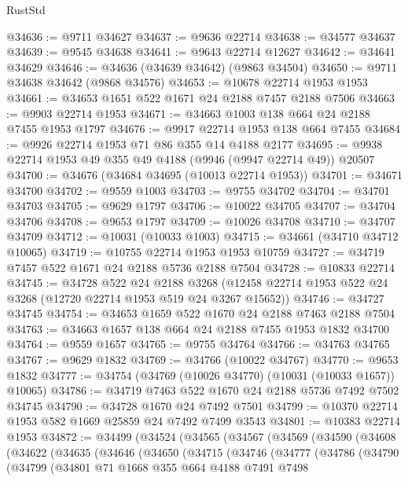 \begin{lexlean}{RustStd}
\begin{coremodule}
@34636 := @9711 @34627
@34637 := @9636 @22714
@34638 := @34577 @34637
@34639 := @9545 @34638
@34641 := @9643 @22714 @12627
@34642 := @34641 @34629
@34646 := @34636 (@34639 @34642) (@9863 @34504)
@34650 := @9711 @34638 @34642 (@9868 @34576)
@34653 := @10678 @22714 @1953 @1953
@34661 := @34653 @1651 @522 @1671 @24 @2188 @7457 @2188 @7506
@34663 := @9903 @22714 @1953
@34671 := @34663 @1003 @138 @664 @24 @2188 @7455 @1953 @1797
@34676 := @9917 @22714 @1953 @138 @664 @7455
@34684 := @9926 @22714 @1953 @71 @86 @355 @14 @4188 @2177
@34695 := @9938 @22714 @1953 @49 @355 @49 @4188 (@9946 (@9947 @22714 @49)) @20507
@34700 := @34676 (@34684 @34695 (@10013 @22714 @1953))
@34701 := @34671 @34700
@34702 := @9559 @1003
@34703 := @9755 @34702
@34704 := @34701 @34703
@34705 := @9629 @1797
@34706 := @10022 @34705
@34707 := @34704 @34706
@34708 := @9653 @1797
@34709 := @10026 @34708
@34710 := @34707 @34709
@34712 := @10031 (@10033 @1003)
@34715 := @34661 (@34710 @34712 @10065)
@34719 := @10755 @22714 @1953 @1953 @10759
@34727 := @34719 @7457 @522 @1671 @24 @2188 @5736 @2188 @7504
@34728 := @10833 @22714
@34745 := @34728
    @522
    @24
    @2188
    @3268
    (@12458 @22714 @1953 @522 @24 @3268 (@12720 @22714 @1953 @519 @24 @3267 @15652))
@34746 := @34727 @34745
@34754 := @34653 @1659 @522 @1670 @24 @2188 @7463 @2188 @7504
@34763 := @34663 @1657 @138 @664 @24 @2188 @7455 @1953 @1832 @34700
@34764 := @9559 @1657
@34765 := @9755 @34764
@34766 := @34763 @34765
@34767 := @9629 @1832
@34769 := @34766 (@10022 @34767)
@34770 := @9653 @1832
@34777 := @34754 (@34769 (@10026 @34770) (@10031 (@10033 @1657)) @10065)
@34786 := @34719 @7463 @522 @1670 @24 @2188 @5736 @7492 @7502 @34745
@34790 := @34728 @1670 @24 @7492 @7501
@34799 := @10370 @22714 @1953 @582 @1669 @25859 @24 @7492 @7499 @3543
@34801 := @10383 @22714 @1953
@34872 := @34499
    (@34524
      (@34565
        (@34567
          (@34569
            (@34590
              (@34608
                (@34622
                  (@34635
                    (@34646
                      (@34650
                        (@34715
                          (@34746
                            (@34777
                              (@34786
                                (@34790
                                  (@34799
                                    (@34801
                                      @71
                                      @1668
                                      @355
                                      @664
                                      @4188
                                      @7491
                                      @7498

\end{coremodule}
\end{lexlean}

